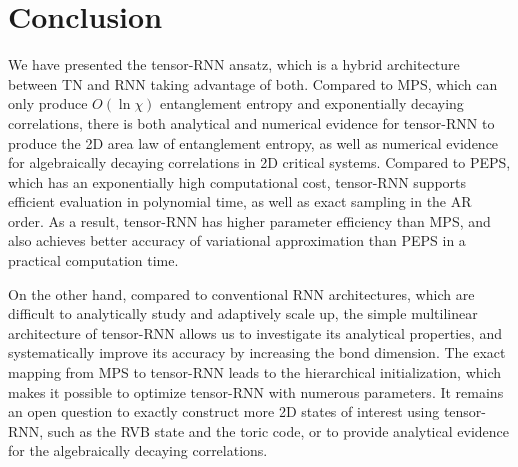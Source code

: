 \section{Conclusion}

We have presented the tensor-RNN ansatz, which is a hybrid architecture between TN and RNN taking advantage of both. Compared to MPS, which can only produce $O(\ln \chi)$ entanglement entropy and exponentially decaying correlations, there is both analytical and numerical evidence for tensor-RNN to produce the 2D area law of entanglement entropy, as well as numerical evidence for algebraically decaying correlations in 2D critical systems. Compared to PEPS, which has an exponentially high computational cost, tensor-RNN supports efficient evaluation in polynomial time, as well as exact sampling in the AR order. As a result, tensor-RNN has higher parameter efficiency than MPS, and also achieves better accuracy of variational approximation than PEPS in a practical computation time.

On the other hand, compared to conventional RNN architectures, which are difficult to analytically study and adaptively scale up, the simple multilinear architecture of tensor-RNN allows us to investigate its analytical properties, and systematically improve its accuracy by increasing the bond dimension. The exact mapping from MPS to tensor-RNN leads to the hierarchical initialization, which makes it possible to optimize tensor-RNN with numerous parameters. It remains an open question to exactly construct more 2D states of interest using tensor-RNN, such as the RVB state and the toric code, or to provide analytical evidence for the algebraically decaying correlations.
